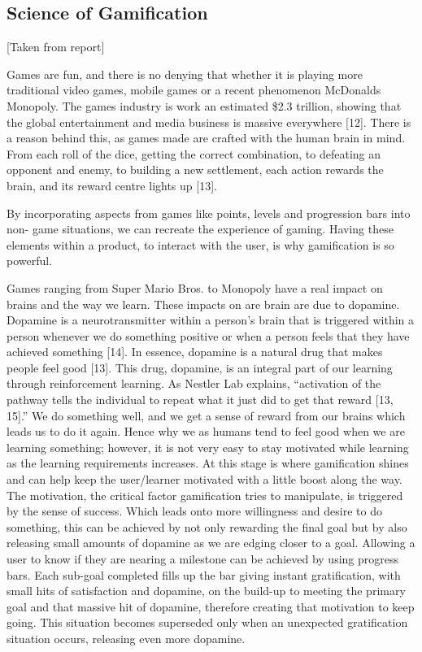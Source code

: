 \documentclass{sigchi}
\begin{document}
\subsection{Science of Gamification}
[Taken from report]

Games are fun, and there is no denying that whether it is playing more traditional video games, mobile games or a recent phenomenon McDonalds Monopoly. The games industry is work an estimated \$2.3 trillion, showing that the global entertainment and media business is massive everywhere [12]. There is a reason behind this, as games made are crafted with the human brain in mind. From each roll of the dice, getting the correct combination, to defeating an opponent and enemy, to building a new settlement, each action rewards the brain, and its reward centre lights up [13]. 

By incorporating aspects from games like points, levels and progression bars into non- game situations, we can recreate the experience of gaming. Having these elements within a product, to interact with the user, is why gamification is so powerful. 

Games ranging from Super Mario Bros. to Monopoly have a real impact on brains and the way we learn. These impacts on are brain are due to dopamine. Dopamine is a neurotransmitter within a person’s brain that is triggered within a person whenever we do something positive or when a person feels that they have achieved something [14]. In essence, dopamine is a natural drug that makes people feel good [13]. This drug, dopamine, is an integral part of our learning through reinforcement learning. As Nestler Lab explains, “activation of the pathway tells the individual to repeat what it just did to get that reward [13, 15].” We do something well, and we get a sense of reward from our brains which leads us to do it again. Hence why we as humans tend to feel good when we are learning something; however, it is not very easy to stay motivated while learning as the learning requirements increases. At this stage is where gamification shines and can help keep the user/learner motivated with a little boost along the way. The motivation, the critical factor gamification tries to manipulate, is triggered by the sense of success. Which leads onto more willingness and desire to do something, this can be achieved by not only rewarding the final goal but by also releasing small amounts of dopamine as we are edging closer to a goal. Allowing a user to know if they are nearing a milestone can be achieved by using progress bars. Each sub-goal completed fills up the bar giving instant gratification, with small hits of satisfaction and dopamine, on the build-up to meeting the primary goal and that massive hit of dopamine, therefore creating that motivation to keep going. This situation becomes superseded only when an unexpected gratification situation occurs, releasing even more dopamine. 
\end{document}
